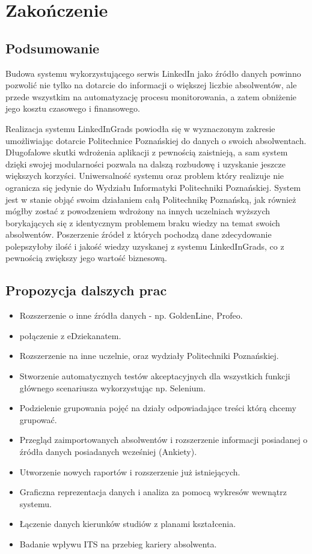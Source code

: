 \chapter{Zakończenie}
\label{Chapter9}

\section{Podsumowanie}
\label{Chapter91}

Budowa systemu wykorzystującego serwis LinkedIn jako źródło danych powinno pozwolić nie tylko na dotarcie do informacji o większej liczbie absolwentów, ale przede wszystkim na automatyzację procesu monitorowania, a zatem obniżenie jego kosztu czasowego i finansowego.

Realizacja systemu LinkedInGrads powiodła się w wyznaczonym zakresie umożliwiając dotarcie Politechnice Poznańskiej do danych o swoich absolwentach. Długofalowe skutki wdrożenia aplikacji z pewnością zaistnieją, a sam system dzięki swojej modularności pozwala na dalszą rozbudowę i uzyskanie jeszcze większych korzyści. Uniwersalność systemu oraz problem który realizuje nie ogranicza się jedynie do Wydziału Informatyki Politechniki Poznańskiej. System jest w stanie objąć swoim działaniem całą Politechnikę Poznańską, jak również mógłby zostać z powodzeniem wdrożony na innych uczelniach wyższych borykających się z identycznym problemem braku wiedzy na temat swoich absolwentów. Poszerzenie źródeł z których pochodzą dane zdecydowanie polepszyłoby ilość i jakość wiedzy uzyskanej z systemu LinkedInGrads, co z pewnością zwiększy jego wartość biznesową.
	
\section{Propozycja dalszych prac}
\label{Chapter92}

\begin{itemize}
\item Rozszerzenie o inne źródła danych - np. GoldenLine, Profeo.
\item połączenie z eDziekanatem.
\item Rozszerzenie na inne uczelnie, oraz wydziały Politechniki Poznańskiej.
\item Stworzenie automatycznych testów akceptacyjnych dla wszystkich funkcji głównego scenariusza wykorzystując np. Selenium.
\item Podzielenie grupowania pojęć na działy odpowiadające treści którą chcemy grupować.
\item Przegląd zaimportowanych absolwentów i rozszerzenie informacji posiadanej o źródła danych posiadanych wcześniej (Ankiety).
\item Utworzenie nowych raportów i rozszerzenie już istniejących.
\item Graficzna reprezentacja danych i analiza za pomocą wykresów wewnątrz systemu.
\item Łączenie danych kierunków studiów z planami kształcenia.
\item Badanie wpływu ITS na przebieg kariery absolwenta.
\end{itemize}